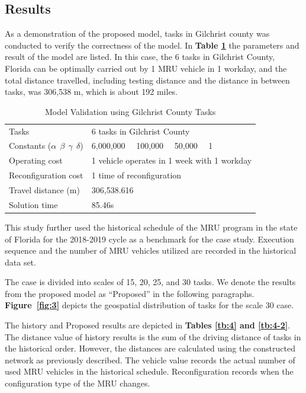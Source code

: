 \documentclass[numbered]{trbunofficial}
\begin{document}
\subsection{Results}
As a demonstration of the proposed model, tasks in Gilchrist county was conducted to verify the correctness of the model. In \textbf{Table \ref{tab:1}} the parameters and result of the model are listed. In this case, the 6 tasks in Gilchrist County, Florida can be optimally carried out by 1 MRU vehicle in 1 workday, and the total distance travelled, including testing distance and the distance in between tasks, was 306,538 m, which is about 192 miles.

\begin{table}[!ht]
\centering
\small
\caption{Model Validation using Gilchrist County Tasks}
\label{tab:1}
\begin{tabular}{@{}ll@{}}
\toprule
\small
Tasks & 6 tasks in Gilchrist County \\
Constants ($\alpha~ ~\beta~ ~\gamma~ ~\delta$) & 6,000,000~ ~100,000~ ~50,000~ ~1\\
Operating cost & 1 vehicle operates in 1 week with 1 workday \\
Reconfiguration cost & 1 time of reconfiguration\\
Travel distance (m) & 306,538.616 \\
Solution time & 85.46s \\ 
\bottomrule
\end{tabular}%
\end{table}



This study further used the historical schedule of the MRU program in the state of Florida for the 2018-2019 cycle as a benchmark for the case study. Execution sequence and the number of MRU vehicles utilized are recorded in the historical data set. 

The case is divided into scales of 15, 20, 25, and 30 tasks. We denote the results from the proposed model as ``Proposed'' in the following paragraphs. \textbf{Figure~\ref{fig:3}} depicts the geospatial distribution of tasks for the scale 30 case.

The history and Proposed results are depicted in \textbf{Tables \ref{tb:4} and \ref{tb:4-2}}. The distance value of history results is the sum of the driving distance of tasks in the historical order. However, the distances are calculated using the constructed network as previously described.  The vehicle value records the actual number of used MRU vehicles in the historical schedule. Reconfiguration records when the configuration type of the MRU changes.
\end{document}
